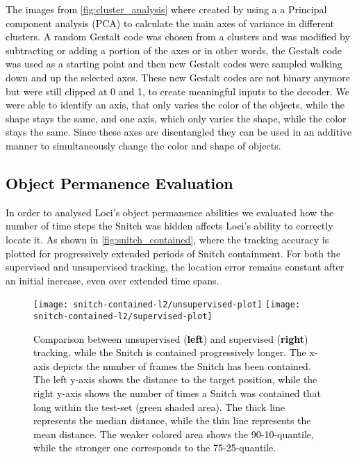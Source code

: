 \documentclass{article} \usepackage{iclr2023_conference_arxiv,times}
\newcommand{\changed}{\textcolor{black}}
\begin{document}
\changed{
The images from \autoref{fig:cluster_analysis} where created by using a a Principal component analysis (PCA) to calculate the main axes of variance in different clusters. A random Gestalt code was chosen from a clusters and was modified by subtracting or adding a portion of the axes or in other words, the Gestalt code was used as a starting point and then new Gestalt codes were sampled walking down and up the selected axes. These new Gestalt codes are not binary anymore but were still clipped at 0 and 1, to create meaningful inputs to the decoder. We were able to identify an axis, that only varies the color of the objects, while the shape stays the same, and one axis, which only varies the shape, while the color stays the same. Since these axes are disentangled they can be used in an additive manner to simultaneously change the color and shape of objects.
}
\subsection{\changed{Object Permanence Evaluation}}

\changed{In order to analysed Loci's object permanence abilities we evaluated how the number of time steps the Snitch was hidden affects Loci's ability to correctly locate it. As shown in \autoref{fig:snitch_contained}, where the tracking accuracy is plotted for progressively extended periods of Snitch containment. For both the supervised and unsupervised tracking, the location error remains constant after an initial increase, even over extended time spans.}

\begin{figure}[t!]
  \texttt{[image: snitch-contained-l2/unsupervised-plot]}
  \texttt{[image: snitch-contained-l2/supervised-plot]}
  \caption{\changed{Comparison between unsupervised (\textbf{left}) and supervised (\textbf{right}) tracking, while the Snitch is contained progressively longer. The x-axis depicts the number of frames the Snitch has been contained. The left y-axis shows the  distance to the target position, while the right y-axis shows the number of times a Snitch was contained that long within the test-set (green shaded area). The thick line represents the median  distance, while the thin line represents the mean  distance. The weaker colored area shows the 90-10-quantile, while the stronger one corresponds to the 75-25-quantile.}}
\label{fig:snitch_contained}
\end{figure}
\end{document}
